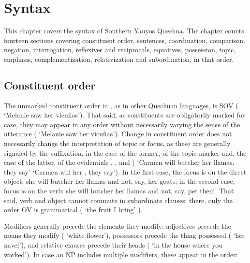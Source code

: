 \chapter{Syntax}\label{ch:syntax}
This chapter covers the syntax of Southern Yauyos Quechua. The chapter counts fourteen sections covering constituent order, sentences, coordination, comparison, negation, interrogation, reflexives and reciprocals, equatives, possession, topic, emphasis, complementization, relativization and subordination, in that order. 

\section{Constituent order}\label{sec:conord}
The unmarked constituent order in \SYQ{}, as in other Quechuan languages, is SOV (   `Melanie saw her vicu\~nas'). That said, as constituents are obligatorily marked for case, they may appear in any order without necessarily varying the sense of the utterance (   `Melanie saw her vicu\~nas'). Change in constituent order does not necessarily change the interpretation of topic or focus, as these are generally signaled by the suffixation, in the case of the former, of the topic marker  and, the case of the latter, of the evidentials , , and  (   `Carmen will butcher her llamas, they say'    `Carmen will  her , they say'). In the first case, the focus is on the direct object: she will butcher her llamas and not, say, her goats; in the second case, focus is on the verb: she will butcher her llamas and not, say, pet them. That said, verb and object cannot commute in subordinate clauses: there, only the order OV is grammatical (  `the fruit I bring'  ).

Modifiers generally precede the elements they modify: adjectives precede the nouns they modify (  `white flower'), possessors precede the thing possessed (  `her navel'), and relative clauses precede their heads (  `in the house where you worked'). In case an NP includes multiple modifiers, these appear in the order:

